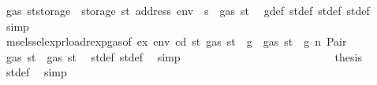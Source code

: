 \begin{isabellebody}
\ {\isachardoublequoteopen}gas\ {\isacharparenleft}{\kern0pt}st{\isacharprime}{\kern0pt}{\isacharprime}{\kern0pt}{\isacharprime}{\kern0pt}{\isasymlparr}storage\ {\isacharcolon}{\kern0pt}{\isacharequal}{\kern0pt}\ {\isacharparenleft}{\kern0pt}storage\ st{\isacharprime}{\kern0pt}{\isacharprime}{\kern0pt}{\isacharprime}{\kern0pt}{\isacharparenright}{\kern0pt}\ {\isacharparenleft}{\kern0pt}address\ env\ {\isacharcolon}{\kern0pt}{\isacharequal}{\kern0pt}\ s{\isacharprime}{\kern0pt}{\isacharparenright}{\kern0pt}{\isasymrparr}{\isacharparenright}{\kern0pt}\ {\isasymle}\ gas\ st{\isacharprime}{\kern0pt}{\isacharprime}{\kern0pt}{\isachardoublequoteclose}\ \isamarkupfalse%
\ g{\isacharunderscore}{\kern0pt}def\ st{\isacharprime}{\kern0pt}{\isacharunderscore}{\kern0pt}def\ st{\isacharprime}{\kern0pt}{\isacharprime}{\kern0pt}{\isacharunderscore}{\kern0pt}def\ st{\isacharprime}{\kern0pt}{\isacharprime}{\kern0pt}{\isacharprime}{\kern0pt}{\isacharunderscore}{\kern0pt}def\ \isamarkupfalse%
\ simp\isanewline
\ \ \ \ \ \ \ \ \ \ \ \ \ \ \ \ \ \ \ \ \ \ \ \ \isamarkupfalse%
\ \isamarkupfalse%
\ msel{\isacharunderscore}{\kern0pt}ssel{\isacharunderscore}{\kern0pt}expr{\isacharunderscore}{\kern0pt}load{\isacharunderscore}{\kern0pt}rexp{\isacharunderscore}{\kern0pt}gas{\isacharparenleft}{\kern0pt}{}{\isacharparenright}{\kern0pt}{\isacharbrackleft}{\kern0pt}of\ ex\ env\ cd\ st{\isacharprime}{\kern0pt}\ {\isachardoublequoteopen}gas\ st\ {\isacharminus}{\kern0pt}\ g{\isachardoublequoteclose}{\isacharbrackright}{\kern0pt}\ {\isacharbackquoteopen}{\isasymnot}\ gas\ st\ {\isasymle}\ g{\isacharbackquoteclose}\ n\ Pair\ \isamarkupfalse%
\ {\isachardoublequoteopen}gas\ st{\isacharprime}{\kern0pt}{\isacharprime}{\kern0pt}\ {\isasymle}\ gas\ st{\isacharprime}{\kern0pt}{\isachardoublequoteclose}\ \isamarkupfalse%
\ st{\isacharprime}{\kern0pt}{\isacharunderscore}{\kern0pt}def\ st{\isacharprime}{\kern0pt}{\isacharprime}{\kern0pt}{\isacharunderscore}{\kern0pt}def\ \isamarkupfalse%
\ simp\isanewline
\ \ \ \ \ \ \ \ \ \ \ \ \ \ \ \ \ \ \ \ \ \ \ \ \isamarkupfalse%
\ \isamarkupfalse%
\ {\isacharquery}{\kern0pt}thesis\ \isamarkupfalse%
\ st{\isacharprime}{\kern0pt}{\isacharunderscore}{\kern0pt}def\ \isamarkupfalse%
\ simp\isanewline
\ \ \ \ \ \ \ \ \ \ \ \ \ \ \ \ \ \ \ \ \ \ \isamarkupfalse%
\isanewline
\ \ \ \ \ \ \ \ \ \ \ \ \ \ \ \ \ \ \ \ \isamarkupfalse%
\isanewline

\end{isabellebody}
